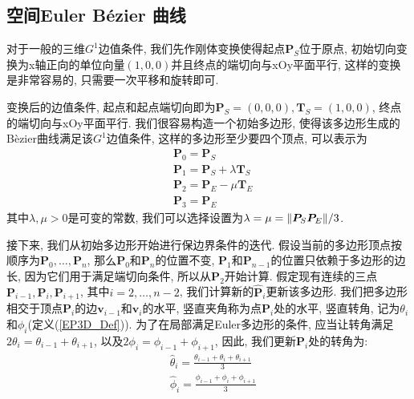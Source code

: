 \documentclass[utf8]{ctexart} %
\begin{document}
	 \subsection{空间Euler B\'{e}zier 曲线}
	 对于一般的三维$G^1$边值条件, 我们先作刚体变换使得起点$\boldsymbol{P}_S$位于原点, 初始切向变换为x轴正向的单位向量$(1,0,0)$并且终点的端切向与xOy平面平行, 这样的变换是非常容易的, 只需要一次平移和旋转即可. \par
	 变换后的边值条件, 起点和起点端切向即为$\boldsymbol{P}_S=(0,0,0), \boldsymbol{T}_S = (1,0,0)$, 终点的端切向与xOy平面平行. 我们很容易构造一个初始多边形, 使得该多边形生成的B\`ezier曲线满足该$G^1$边值条件, 这样的多边形至少要四个顶点, 可以表示为
	 \begin{equation}
	 	\begin{aligned}
	 		&\boldsymbol{P}_0 = \boldsymbol{P}_S\\
	 		&\boldsymbol{P}_1 = \boldsymbol{P}_S+\lambda\boldsymbol{T}_S\\
	 		&\boldsymbol{P}_2 = \boldsymbol{P}_E-\mu\boldsymbol{T}_E\\
	 		&\boldsymbol{P}_3 = \boldsymbol{P}_E
	 	\end{aligned}
	 \end{equation}
	 其中$\lambda, \mu>0$是可变的常数, 我们可以选择设置为$\lambda = \mu = \Arrowvert\boldsymbol{P}_S\boldsymbol{P}_E\Arrowvert/3$. \par 
	 接下来, 我们从初始多边形开始进行保边界条件的迭代. 假设当前的多边形顶点按顺序为$\boldsymbol{P}_0, \dots,\boldsymbol{P}_n$, 那么$\boldsymbol{P}_0$和$\boldsymbol{P}_n$的位置不变, $\boldsymbol{P}_1$和$\boldsymbol{P}_{n-1}$的位置只依赖于多边形的边长, 因为它们用于满足端切向条件, 所以从$\boldsymbol{P}_2$开始计算. 假定现有连续的三点$\boldsymbol{P}_{i-1},\boldsymbol{P}_i,\boldsymbol{P}_{i+1}$, 其中$i=2,\dots,n-2$, 我们计算新的$\hat{\boldsymbol{P}}_i$更新该多边形. 我们把多边形相交于顶点$\boldsymbol{P}_i$的边$\boldsymbol{v}_{i-1}$和$\boldsymbol{v}_{i}$的水平, 竖直夹角称为点$\boldsymbol{P}_i$处的水平, 竖直转角, 记为$\theta_i$和$\phi_i$(定义(\ref{EP3D_Def})). 为了在局部满足Euler多边形的条件, 应当让转角满足$2\theta_i = \theta_{i-1}+\theta_{i+1}$, 以及$2\phi_{i} = \phi_{i-1}+\phi_{i+1}$, 因此, 我们更新$\boldsymbol{P}_i$处的转角为:
	 \begin{equation}\label{new_theta}
	 	\begin{aligned}
	 		&\hat{\theta}_i = \frac{\theta_{i-1}+\theta_i+\theta_{i+1}}3\\
	 		&\hat{\phi}_i =
	 		\frac{\phi_{i-1}+\phi_i+\phi_{i+1}}3
	 	\end{aligned}
	 \end{equation}
\end{document}
